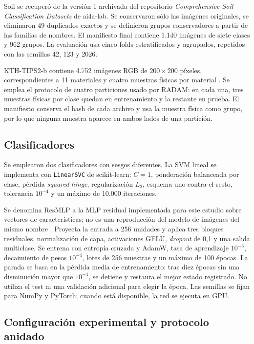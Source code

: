 \documentclass[a4paper,fleqn]{cas-sc}
\begin{document}
Soil se recuperó de la versión 1 archivada del repositorio \emph{Comprehensive Soil Classification Datasets} de ai4a-lab. Se conservaron sólo las imágenes originales, se eliminaron 49 duplicados exactos y se definieron grupos conservadores a partir de las familias de nombres. El manifiesto final contiene 1.140 imágenes de siete clases y 962 grupos. La evaluación usa cinco folds estratificados y agrupados, repetidos con las semillas 42, 123 y 2026.

KTH-TIPS2-b contiene 4.752 imágenes RGB de $200\times200$ píxeles, correspondientes a 11 materiales y cuatro muestras físicas por material \citep{mallikarjuna2005kth}. Se emplea el protocolo de cuatro particiones usado por RADAM: en cada una, tres muestras físicas por clase quedan en entrenamiento y la restante en prueba. El manifiesto conserva el hash de cada archivo y usa la muestra física como grupo, por lo que ninguna muestra aparece en ambos lados de una partición.

\subsection{Clasificadores}

Se emplearon dos clasificadores con sesgos diferentes. La SVM lineal se implementa con \texttt{LinearSVC} de scikit-learn: $C=1$, ponderación balanceada por clase, pérdida \emph{squared hinge}, regularización $L_2$, esquema uno-contra-el-resto, tolerancia $10^{-4}$ y un máximo de 10.000 iteraciones.

Se denomina ResMLP a la MLP residual implementada para este estudio sobre vectores de características; no es una reproducción del modelo de imágenes del mismo nombre \citep{touvron2021resmlp}. Proyecta la entrada a 256 unidades y aplica tres bloques residuales, normalización de capa, activaciones GELU, \emph{dropout} de 0,1 y una salida multiclase. Se entrena con entropía cruzada y AdamW, tasa de aprendizaje $10^{-3}$, decaimiento de pesos $10^{-4}$, lotes de 256 muestras y un máximo de 100 épocas. La parada se basa en la pérdida media de entrenamiento: tras diez épocas sin una disminución mayor que $10^{-4}$, se detiene y restaura el mejor estado registrado. No utiliza el test ni una validación adicional para elegir la época. Las semillas se fijan para NumPy y PyTorch; cuando está disponible, la red se ejecuta en GPU.

\subsection{Configuración experimental y protocolo anidado}
\end{document}
